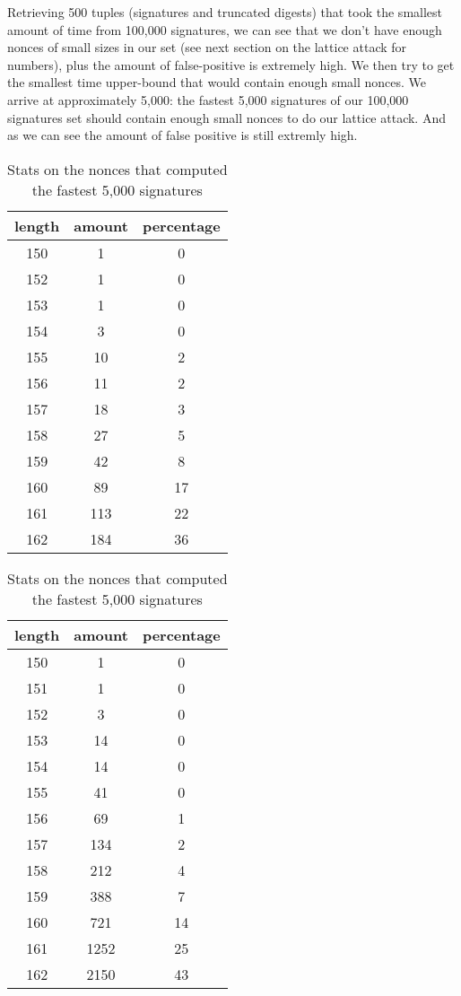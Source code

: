 \documentclass[a4paper,11pt]{article}
\begin{document}
Retrieving 500 tuples (signatures and truncated digests) that took the smallest amount of time from 100,000 signatures, we can see that we don't have enough nonces of small sizes in our set (see next section on the lattice attack for numbers), plus the amount of false-positive is extremely high. We then try to get the smallest time upper-bound that would contain enough small nonces. We arrive at approximately 5,000: the fastest 5,000 signatures of our 100,000 signatures set should contain enough small nonces to do our lattice attack. And as we can see the amount of false positive is still extremly high.

\begin{table}[H]
\parbox{.45\linewidth}{
\centering
\begin{tabular}{@{} *3c @{}}
\toprule
length&amount&percentage\\
\midrule
150  &   1   &    0\\
152  &   1  &     0\\
153  &   1  &     0\\
154  &   3  &     0\\
155  &   10  &    2\\
156  &   11  &    2\\
157   &  18  &    3\\
158  &   27 &     5\\
159  &   42 &     8\\
160  &   89  &    17\\
161  &   113 &    22\\
162  &   184 &    36\\
\bottomrule
\end{tabular}
\caption{Stats on the nonces that computed the fastest 500 signatures}
}
\hfill
\parbox{.45\linewidth}{
\centering
\begin{tabular}{@{} *3c @{}}
\toprule
length&amount&percentage\\
\midrule
150  &   1     &  0\\
151   &  1  &     0\\
152  &   3 &      0\\
153   &  14  &    0\\
154  &   14 &     0\\
155  &   41 &     0\\
156   &  69  &    1\\
157  &   134    & 2\\
158   &  212&     4\\
159   &  388 &    7\\
160  &   721 &    14\\
161  &   1252   & 25\\
162    & 2150 &   43\\
\bottomrule
\end{tabular}
\caption{Stats on the nonces that computed the fastest 5,000 signatures}
}
\end{table}
\end{document}
